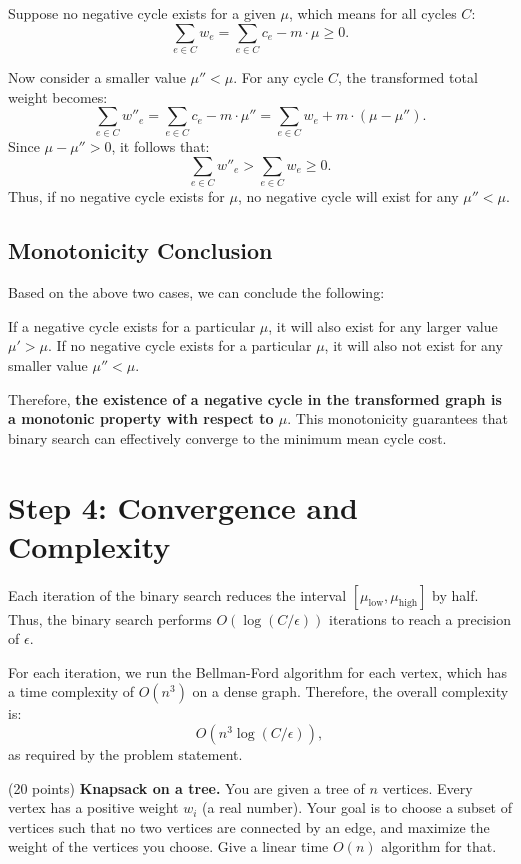 Suppose no negative cycle exists for a given \(\mu\), which means for all cycles \( C \):
\[
\sum_{e \in C} w_e = \sum_{e \in C} c_e - m \cdot \mu \geq 0.
\]

Now consider a smaller value \(\mu'' < \mu\). For any cycle \( C \), the transformed total weight becomes:
\[
\sum_{e \in C} w''_e = \sum_{e \in C} c_e - m \cdot \mu'' = \sum_{e \in C} w_e + m \cdot (\mu - \mu'').
\]
Since \(\mu - \mu'' > 0\), it follows that:
\[
\sum_{e \in C} w''_e > \sum_{e \in C} w_e \geq 0.
\]
Thus, if no negative cycle exists for \(\mu\), no negative cycle will exist for any \(\mu'' < \mu\).


\subsection*{Monotonicity Conclusion}

Based on the above two cases, we can conclude the following:

If a negative cycle exists for a particular \(\mu\), it will also exist for any larger value \(\mu' > \mu\).
If no negative cycle exists for a particular \(\mu\), it will also not exist for any smaller value \(\mu'' < \mu\).


Therefore, \textbf{the existence of a negative cycle in the transformed graph is a monotonic property with respect to \(\mu\)}. This monotonicity guarantees that binary search can effectively converge to the minimum mean cycle cost.


\section*{Step 4: Convergence and Complexity}

Each iteration of the binary search reduces the interval \([ \mu_{\text{low}}, \mu_{\text{high}} ]\) by half. Thus, the binary search performs \( O(\log(C / \epsilon)) \) iterations to reach a precision of \( \epsilon \).

For each iteration, we run the Bellman-Ford algorithm for each vertex, which has a time complexity of \( O(n^3) \) on a dense graph. Therefore, the overall complexity is:
\[
O(n^3 \log(C / \epsilon)),
\]
as required by the problem statement.

    \item  (20 points) \textbf{Knapsack on a tree.} You are given a tree of $n$ vertices. Every vertex has a positive weight $w_i$ (a real number). Your goal is to choose a subset of vertices such that no two vertices are connected by an edge, and maximize the weight of the vertices you choose. Give a linear time $O(n)$ algorithm for that.

